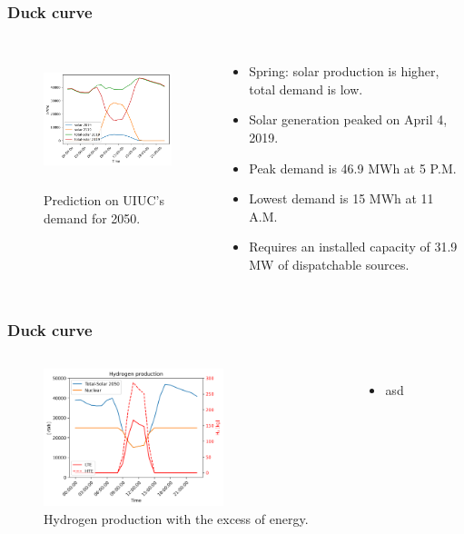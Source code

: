 \begin{frame}
\frametitle{Duck curve}
\begin{columns}
    \column[t]{4.5cm}
	\begin{figure}[htbp!]
		\begin{center}
			\includegraphics[height=4.0cm]{images/uiuc-duck}
		\end{center}
		\caption{Prediction on UIUC's demand for 2050.}
	\end{figure}

    \column[t]{5.5cm}
    \begin{itemize}
 		\item Spring: solar production is higher, total demand is low.
 		\item Solar generation peaked on April 4, 2019.
 		\item Peak demand is 46.9 MWh at 5 P.M.
 		\item Lowest demand is 15 MWh at 11 A.M.
 		\item Requires an installed capacity of 31.9 MW of dispatchable sources.
 	\end{itemize}

\end{columns}
\end{frame}


\begin{frame}
\frametitle{Duck curve}
\begin{columns}
    \column[t]{4.5cm}
	\begin{figure}[htbp!]
		\begin{center}
			\includegraphics[height=4.0cm]{images/uiuc-hydro2}
		\end{center}
		\caption{Hydrogen production with the excess of energy.}
	\end{figure}

    \column[t]{5.5cm}
    \begin{itemize}
 		\item asd
 	\end{itemize}

\end{columns}
\end{frame}

